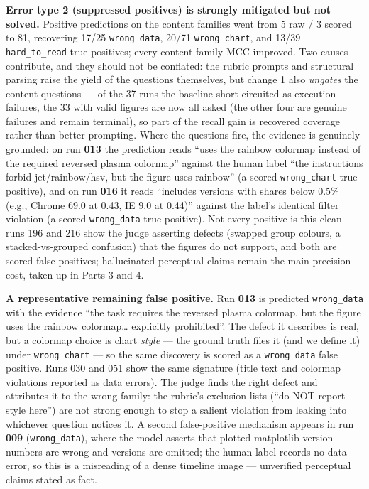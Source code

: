 \documentclass[11pt]{article}
\begin{document}
\textbf{Error type 2 (suppressed positives) is strongly mitigated but not
solved.} Positive predictions on the content families went from 5 raw / 3
scored to 81, recovering 17/25 \texttt{wrong\_data}, 20/71
\texttt{wrong\_chart}, and 13/39 \texttt{hard\_to\_read} true positives;
every content-family MCC improved. Two causes contribute, and they should
not be conflated: the rubric prompts and structural parsing raise the yield
of the questions themselves, but change 1 also \emph{ungates} the content
questions --- of the 37 runs the baseline short-circuited as execution
failures, the 33 with valid figures are now all asked (the other four are
genuine failures and remain terminal), so part of the recall gain is
recovered coverage rather than better prompting. Where the questions fire, the
evidence is genuinely grounded: on run \textbf{013} the prediction reads
``uses the rainbow colormap instead of the required reversed plasma
colormap'' against the human label ``the instructions forbid
jet/rainbow/hsv, but the figure uses rainbow'' (a scored
\texttt{wrong\_chart} true positive), and on run \textbf{016} it reads
``includes versions with shares below 0.5\% (e.g., Chrome 69.0 at 0.43, IE
9.0 at 0.44)'' against the label's identical filter violation (a scored
\texttt{wrong\_data} true positive). Not every positive is this clean ---
runs 196 and 216 show the judge asserting defects (swapped group colours, a
stacked-vs-grouped confusion) that the figures do not support, and both are
scored false positives; hallucinated perceptual claims remain the main
precision cost, taken up in Parts 3 and 4.

\textbf{A representative remaining false positive.} Run \textbf{013} is
predicted \texttt{wrong\_data} with the evidence ``the task requires the
reversed plasma colormap, but the figure uses the rainbow colormap\ldots
explicitly prohibited''. The defect it describes is real, but a colormap
choice is chart \emph{style} --- the ground truth files it (and we define
it) under \texttt{wrong\_chart} --- so the same discovery is scored as a
\texttt{wrong\_data} false positive. Runs 030 and 051 show the same
signature (title text and colormap violations reported as data errors). The
judge finds the right defect and attributes it to the wrong family: the
rubric's exclusion lists (``do NOT report style here'') are not strong
enough to stop a salient violation from leaking into whichever question
notices it. A second false-positive mechanism appears in run \textbf{009}
(\texttt{wrong\_data}), where the model asserts that plotted matplotlib
version numbers are wrong and versions are omitted; the human label records
no data error, so this is a misreading of a dense timeline image ---
unverified perceptual claims stated as fact.
\end{document}
